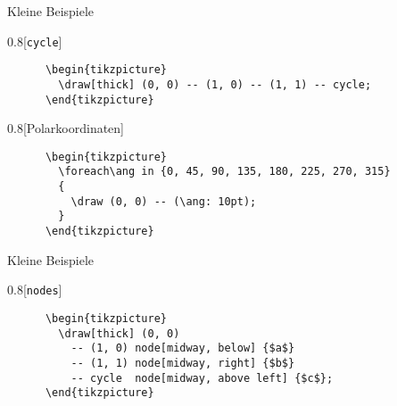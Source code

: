 \begin{frame}[fragile]{Kleine Beispiele}
  \begin{CodeExample}{0.8}[\texttt{cycle}]
    \begin{verbatim}
      \begin{tikzpicture}
        \draw[thick] (0, 0) -- (1, 0) -- (1, 1) -- cycle;
      \end{tikzpicture}
    \end{verbatim}
  \CodeResult
  \end{CodeExample}
  \begin{CodeExample}{0.8}[Polarkoordinaten]
    \begin{verbatim}
      \begin{tikzpicture}
        \foreach\ang in {0, 45, 90, 135, 180, 225, 270, 315}
        {
          \draw (0, 0) -- (\ang: 10pt);
        }
      \end{tikzpicture}
    \end{verbatim}
  \CodeResult
  \end{CodeExample}
\end{frame}

\begin{frame}[fragile]{Kleine Beispiele}
  \begin{CodeExample}{0.8}[\texttt{nodes}]
    \begin{verbatim}
      \begin{tikzpicture}
        \draw[thick] (0, 0)
          -- (1, 0) node[midway, below] {$a$}
          -- (1, 1) node[midway, right] {$b$}
          -- cycle  node[midway, above left] {$c$};
      \end{tikzpicture}
    \end{verbatim}
  \CodeResult
  \end{CodeExample}
\end{frame}

